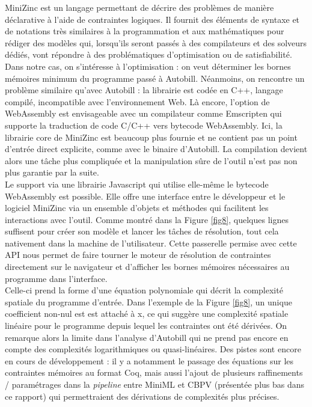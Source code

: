 \documentclass[12pt]{article}
\begin{document}
MiniZinc est un langage permettant de décrire des problèmes de manière déclarative à l'aide de contraintes logiques. Il fournit des éléments de syntaxe et de notations très similaires à la programmation et aux mathématiques pour rédiger des modèles qui, lorsqu'ils seront passés à des compilateurs et des solveurs dédiés, vont répondre à des problématiques d'optimisation ou de satisfiabilité. Dans notre cas, on s'intéresse à l'optimisation : on veut déterminer les bornes mémoires minimum du programme passé à Autobill.
Néanmoins, on rencontre un problème similaire qu'avec Autobill : la librairie est codée en C++, langage compilé, incompatible avec l'environnement Web. Là encore, l'option de WebAssembly est envisageable avec un compilateur comme Emscripten \cite{emscripten} qui supporte la traduction de code C/C++ vers bytecode WebAssembly. Ici, la librairie core de MiniZinc est beaucoup plus fournie et ne contient pas un point d'entrée direct explicite, comme avec le binaire d'Autobill. La compilation devient alors une tâche plus compliquée et la manipulation sûre de l'outil n'est pas non plus garantie par la suite. \\

Le support via une librairie Javascript qui utilise elle-même le bytecode WebAssembly est possible. Elle offre une interface entre le développeur et le logiciel MiniZinc via un ensemble d'objets et méthodes qui facilitent les interactions avec l'outil. Comme montré dans la Figure \ref{fig8}, quelques lignes suffisent pour créer son modèle et lancer les tâches de résolution, tout cela nativement dans la machine de l'utilisateur. Cette passerelle permise avec cette API nous permet de faire tourner le moteur de résolution de contraintes directement sur le navigateur et d'afficher les bornes mémoires nécessaires au programme dans l'interface. \\ 

Celle-ci prend la forme d'une équation polynomiale qui décrit la complexité spatiale du programme d'entrée. Dans l'exemple de la Figure \ref{fig8}, un unique coefficient non-nul est est attaché à x, ce qui suggère une complexité spatiale linéaire pour le programme depuis lequel les contraintes ont été dérivées. On remarque alors la limite dans l'analyse d'Autobill qui ne prend pas encore en compte des complexités logarithmiques ou quasi-linéaires. Des pistes sont encore en cours de développement : il y a notamment le passage des équations sur les contraintes mémoires au format Coq, mais aussi l'ajout de plusieurs raffinements / paramétrages dans la \textit{pipeline} entre MiniML et CBPV (présentée plus bas dans ce rapport) qui permettraient des dérivations de complexités plus précises. \\
\end{document}
